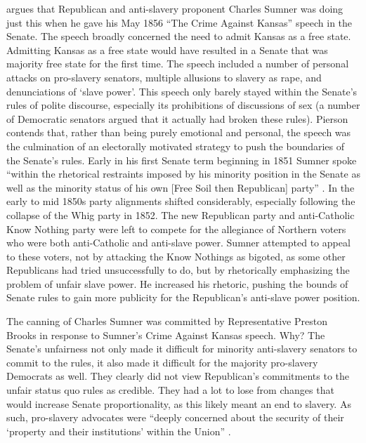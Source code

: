 \documentclass[a4paper]{article}\usepackage[]{graphicx}\usepackage[]{color}
\begin{document}
\cite{Pierson1995} argues that Republican and anti-slavery proponent Charles Sumner was doing just this when he gave his May 1856 ``The Crime Against Kansas'' speech in the Senate. The speech broadly concerned the need to admit Kansas as a free state. Admitting Kansas as a free state would have resulted in a Senate that was majority free state for the first time. The speech included a number of personal attacks on pro-slavery senators, multiple allusions to slavery as rape, and denunciations of `slave power'. This speech only barely stayed within the Senate's rules of polite discourse, especially its prohibitions of discussions of sex (a number of Democratic senators argued that it actually had broken these rules). Pierson contends that, rather than being purely emotional and personal, the speech was the culmination of an electorally motivated strategy to push the boundaries of the Senate's rules. Early in his first Senate term beginning in 1851 Sumner spoke ``within the rhetorical restraints imposed by his minority position in the Senate as well as the minority status of his own [Free Soil then Republican] party'' \cite[534]{Pierson1995}. In the early to mid 1850s party alignments shifted considerably, especially following the collapse of the Whig party in 1852. The new Republican party and anti-Catholic Know Nothing party were left to compete for the allegiance of Northern voters who were both anti-Catholic and anti-slave power. Sumner attempted to appeal to these voters, not by attacking the Know Nothings as bigoted, as some other Republicans had tried unsuccessfully to do, but by rhetorically emphasizing the problem of unfair slave power. He increased his rhetoric, pushing the bounds of Senate rules to gain more publicity for the Republican's anti-slave power position.   

The canning of Charles Sumner was committed by Representative Preston Brooks in response to Sumner's Crime Against Kansas speech. Why? The Senate's unfairness not only made it difficult for minority anti-slavery senators to commit to the rules, it also made it difficult for the majority pro-slavery Democrats as well. They clearly did not view Republican's commitments to the unfair status quo rules as credible. They had a lot to lose from changes that would increase Senate proportionality, as this likely meant an end to slavery. As such, pro-slavery advocates were ``deeply concerned about the security of their `property and their institutions' within the Union'' \cite[281]{Mittal2013}. 
\end{document}
